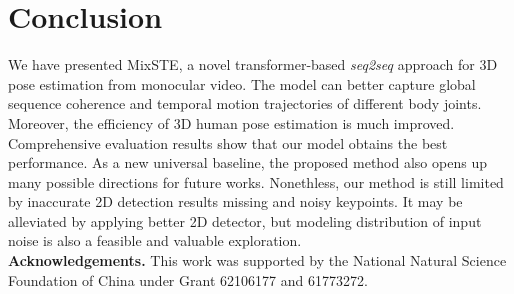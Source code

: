 \documentclass[10pt,twocolumn,letterpaper]{article}
\begin{document}
	\section{Conclusion}
	We have presented MixSTE, a novel transformer-based \textit{seq2seq} approach for 3D pose estimation from monocular video.
	The model can better capture global sequence coherence and temporal motion trajectories of different body joints.
Moreover, the efficiency of 3D human pose estimation is much improved.
	Comprehensive evaluation results show that our model obtains the best performance.
	As a new universal baseline, the proposed method also opens up many possible directions for future works.
	Nonethless, our method is still limited by inaccurate 2D detection results \eg missing and noisy keypoints.
	It may be alleviated by applying better 2D detector, but modeling distribution of input noise is also a feasible and valuable exploration.\\
	\textbf{Acknowledgements.} This work was supported by the National Natural Science Foundation of China under Grant 62106177 and 61773272.
	
	
{\small
		

	}
	
\end{document}
